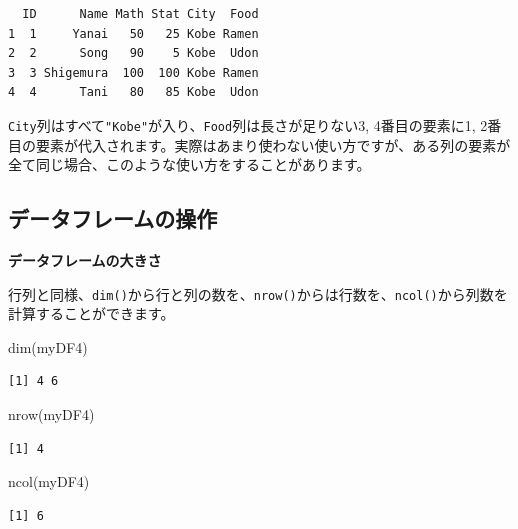 \documentclass[
  a4paper,
  pandoc,
  ja=standard,
  jafont=haranoaji]{bxjsbook}
\newenvironment{Shaded}{\begin{snugshade}}{\end{snugshade}}
\newcommand{\FunctionTok}[1]{\textcolor[rgb]{0.28,0.35,0.67}{#1}}
\newcommand{\NormalTok}[1]{\textcolor[rgb]{0.00,0.48,0.65}{#1}}
\begin{document}
\begin{verbatim}
  ID      Name Math Stat City  Food
1  1     Yanai   50   25 Kobe Ramen
2  2      Song   90    5 Kobe  Udon
3  3 Shigemura  100  100 Kobe Ramen
4  4      Tani   80   85 Kobe  Udon
\end{verbatim}

\texttt{City}列はすべて\texttt{"Kobe"}が入り、\texttt{Food}列は長さが足りない3,
4番目の要素に1,
2番目の要素が代入されます。実際はあまり使わない使い方ですが、ある列の要素が全て同じ場合、このような使い方をすることがあります。

\hypertarget{ux30c7ux30fcux30bfux30d5ux30ecux30fcux30e0ux306eux64cdux4f5c}{%
\subsection{データフレームの操作}\label{ux30c7ux30fcux30bfux30d5ux30ecux30fcux30e0ux306eux64cdux4f5c}}

\textbf{データフレームの大きさ}

行列と同様、\texttt{dim()}から行と列の数を、\texttt{nrow()}からは行数を、\texttt{ncol()}から列数を計算することができます。

\begin{Shaded}
\begin{Highlighting}[numbers=left,,]
\FunctionTok{dim}\NormalTok{(myDF4)}
\end{Highlighting}
\end{Shaded}

\begin{verbatim}
[1] 4 6
\end{verbatim}

\begin{Shaded}
\begin{Highlighting}[numbers=left,,]
\FunctionTok{nrow}\NormalTok{(myDF4)}
\end{Highlighting}
\end{Shaded}

\begin{verbatim}
[1] 4
\end{verbatim}

\begin{Shaded}
\begin{Highlighting}[numbers=left,,]
\FunctionTok{ncol}\NormalTok{(myDF4)}
\end{Highlighting}
\end{Shaded}

\begin{verbatim}
[1] 6
\end{verbatim}
\end{document}
